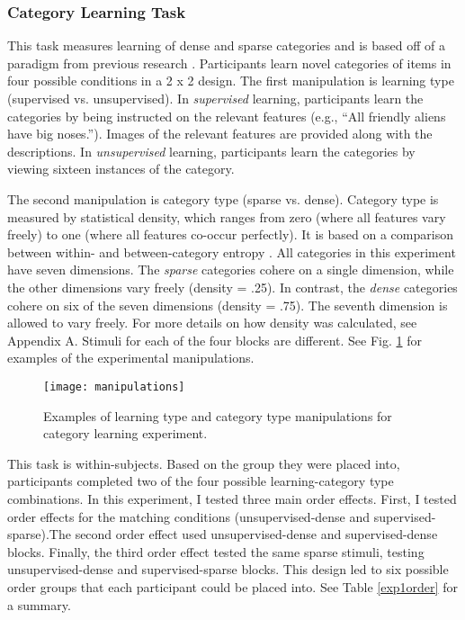 \documentclass[../dissertation.tex]{subfiles}
\begin{document}
\subsubsection{Category Learning Task}
	This task measures learning of dense and sparse categories and is based off of a paradigm from previous research \citep{Kloos2008}. Participants learn novel categories of items in four possible conditions in a 2 x 2 design. The first manipulation is learning type (supervised vs. unsupervised). In \textit{supervised} learning, participants learn the categories by being instructed on the relevant features (e.g., “All friendly aliens have big noses.”). Images of the relevant features are provided along with the descriptions. In \textit{unsupervised} learning, participants learn the categories by viewing sixteen instances of the category. \par
	The second manipulation is category type (sparse vs. dense). Category type is measured by statistical density, which ranges from zero (where all features vary freely) to one (where all features co-occur perfectly). It is based on a comparison between within- and between-category entropy \citep{Sloutsky2010}. All categories in this experiment have seven dimensions. The \textit{sparse} categories cohere on a single dimension, while the other dimensions vary freely (density = .25). In contrast, the \textit{dense} categories cohere on six of the seven dimensions (density = .75). The seventh dimension is allowed to vary freely. For more details on how density was calculated, see Appendix A. Stimuli for each of the four blocks are different. See Fig. \ref{sloutskymanip} for examples of the experimental manipulations. \par
\begin{figure}[htp]
\texttt{[image: manipulations]}
\caption[Example stimuli for category learning task]{Examples of learning type and category type manipulations for category learning experiment.}
\vspace{-10pt}
\label{sloutskymanip}
\end{figure}
	This task is within-subjects. Based on the group they were placed into, participants completed two of the four possible learning-category type combinations. In this experiment, I tested three main order effects. First, I tested order effects for the matching conditions (unsupervised-dense and supervised-sparse).The second order effect used unsupervised-dense and supervised-dense blocks. Finally, the third order effect tested the same sparse stimuli, testing unsupervised-dense and supervised-sparse blocks. This design led to six possible order groups that each participant could be placed into. See Table \ref{exp1order} for a summary. 
\end{document}
